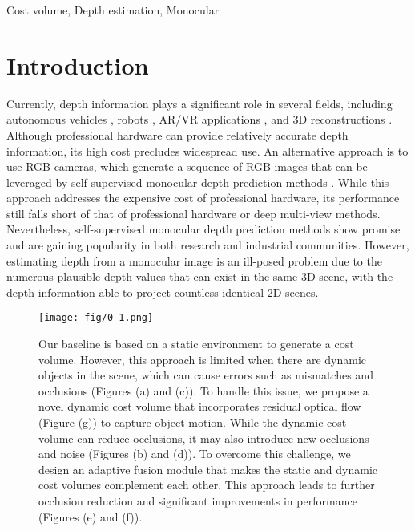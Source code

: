 \documentclass[journal]{IEEEtran}
\begin{document}
\begin{IEEEkeywords}
Cost volume, Depth estimation, Monocular
\end{IEEEkeywords}

\section{Introduction}
Currently, depth information plays a significant role in several fields, including autonomous vehicles \cite{geiger2012we}, robots \cite{choi2013fast}, AR/VR applications \cite{luo2020consistent}, and 3D reconstructions \cite{newcombe2011real}. Although professional hardware can provide relatively accurate depth information, its high cost precludes widespread use. An alternative approach is to use RGB cameras, which generate a sequence of RGB images that can be leveraged by self-supervised monocular depth prediction methods \cite{garg2016unsupervised, song2021monocular, cao2018monocular, mohaghegh2018aggregation, ye2019deep}. While this approach addresses the expensive cost of professional hardware, its performance still falls short of that of professional hardware or deep multi-view methods. Nevertheless, self-supervised monocular depth prediction methods show promise and are gaining popularity in both research and industrial communities. However, estimating depth from a monocular image is an ill-posed problem due to the numerous plausible depth values that can exist in the same 3D scene, with the depth information able to project countless identical 2D scenes.

\begin{figure}[t]
  \centering
   \texttt{[image: fig/0-1.png]}
   \caption{Our baseline \cite{manydepth} is based on a static environment to generate a cost volume. However, this approach is limited when there are dynamic objects in the scene, which can cause errors such as mismatches and occlusions (Figures (a) and (c)). To handle this issue, we propose a novel dynamic cost volume that incorporates residual optical flow (Figure (g)) to capture object motion. While the dynamic cost volume can reduce occlusions, it may also introduce new occlusions and noise (Figures (b) and (d)). To overcome this challenge, we design an adaptive fusion module that makes the static and dynamic cost volumes complement each other. This approach leads to further occlusion reduction and significant improvements in performance (Figures (e) and (f)).}
   \label{fig:0}
\end{figure}
\end{document}
